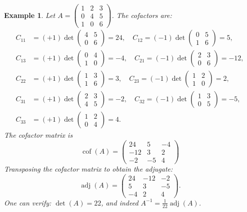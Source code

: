 \documentclass{article}
\newtheorem*{example}{Example}
\begin{document}
\begin{example}
    Let $A = \begin{pmatrix}1&2&3\\0&4&5\\1&0&6\end{pmatrix}$. The cofactors are:
    \begin{align*}
        C_{11} &= (+1)\det\begin{pmatrix}4&5\\0&6\end{pmatrix} = 24, \quad C_{12} = (-1)\det\begin{pmatrix}0&5\\1&6\end{pmatrix} = 5, \\
        C_{13} &= (+1)\det\begin{pmatrix}0&4\\1&0\end{pmatrix} = -4, \quad C_{21} = (-1)\det\begin{pmatrix}2&3\\0&6\end{pmatrix} = -12, \\
        C_{22} &= (+1)\det\begin{pmatrix}1&3\\1&6\end{pmatrix} = 3, \quad C_{23} = (-1)\det\begin{pmatrix}1&2\\1&0\end{pmatrix} = 2, \\
        C_{31} &= (+1)\det\begin{pmatrix}2&3\\4&5\end{pmatrix} = -2, \quad C_{32} = (-1)\det\begin{pmatrix}1&3\\0&5\end{pmatrix} = -5, \\
        C_{33} &= (+1)\det\begin{pmatrix}1&2\\0&4\end{pmatrix} = 4.
    \end{align*}
    The cofactor matrix is
    \[\operatorname{cof}(A) = \begin{pmatrix}24&5&-4\\-12&3&2\\-2&-5&4\end{pmatrix}\]
    Transposing the cofactor matrix to obtain the adjugate:
    \[\operatorname{adj}(A) = \begin{pmatrix}24&-12&-2\\5&3&-5\\-4&2&4\end{pmatrix}.\]
    One can verify: $\det(A) = 22$, and indeed $A^{-1} = \frac{1}{22}\operatorname{adj}(A)$.
\end{example}
\end{document}
